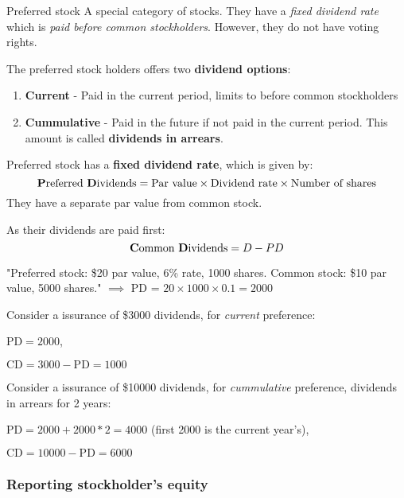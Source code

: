 \begin{theorem}
    {Preferred stock}
    A special category of stocks. They have a \textit{fixed dividend rate} which is \textit{paid before common stockholders}. However, they do not have voting rights.

    The preferred stock holders offers two \textbf{dividend options}:
    \begin{enumerate}
        \item \textbf{Current} - Paid in the current period, limits to before common stockholders
        \item \textbf{Cummulative} - Paid in the future if not paid in the current period. This amount is called \textbf{dividends in arrears}.
    \end{enumerate}
    Preferred stock has a \textbf{fixed dividend rate}, which is given by:
    \[\text{\textbf{P}referred \textbf{D}ividends} = \text{Par value} \times \text{Dividend rate} \times \text{Number of shares}\]
    They have a separate par value from common stock.

    As their dividends are paid first:
    \[\text{\textbf{C}ommon \textbf{D}ividends} = D - PD\]

    \tcblower

    "Preferred stock: \$20 par value, 6\% rate, 1000 shares. Common stock: \$10 par value, 5000 shares." $\implies$ PD = $20 \times 1000 \times 0.1 = 2000$

    Consider a issurance of \$3000 dividends, for \textit{current} preference:

    $\text{PD}=2000$,

    $\text{CD} = 3000 - \text{PD} = 1000$

    Consider a issurance of \$10000 dividends, for \textit{cummulative} preference, dividends in arrears for 2 years:

    $\text{PD} = 2000 + 2000 * 2 = 4000$ (first 2000 is the current year's),

    $\text{CD} = 10000 - \text{PD} = 6000$


\end{theorem}
\label{def:preferred_stock}

\subsubsection{Reporting stockholder's equity}

